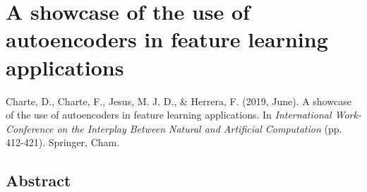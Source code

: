 \documentclass[
	fontsize=11pt, %
	twoside=false, %
	open=any, %
	secnumdepth=1, %
]{kaobook}
\begin{document}
%
\renewcommand*{\thechapter}{\Roman{chapter}}
\addtocounter{chapter}{3}
\chapter{A showcase of the use of autoencoders in feature learning applications}

\begin{widepar}
  \begin{kaobox}[frametitle=Source]
Charte, D., Charte, F., Jesus, M. J. D., \& Herrera, F. (2019, June). A showcase of the use of autoencoders in feature learning applications. In \textit{International Work-Conference on the Interplay Between Natural and Artificial Computation} (pp. 412-421). Springer, Cham.
\end{kaobox}
\end{widepar}

%
%
%
\section*{Abstract}
\end{document}
